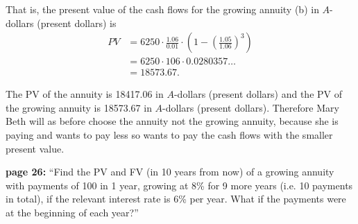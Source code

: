 \documentclass{amsart}
\begin{document}
That is, the present value of the cash flows for the growing annuity (b)
in $A$-dollars (present dollars) is
\begin{align*}
PV&=6250 \cdot \frac{1.06}{0.01} \cdot \left(1- \left( \frac{1.05}{1.06} \right)^3\right)\\
&=6250 \cdot 106 \cdot 0.0280357\ldots\\
&=18573.67.
\end{align*}

The PV of the annuity is 18417.06 in $A$-dollars (present dollars) and the PV of the growing
annuity is 18573.67 in $A$-dollars (present dollars). Therefore
Mary Beth will as before choose the annuity not the growing annuity, because she is paying and wants to pay
less so wants to pay the cash flows with the smaller present value.

\newpage

\textbf{page 26:} ``Find the PV and FV (in 10 years from now) of a growing annuity with payments of 100 in 1 year, growing at 8\% for 9 more years (i.e. 10 payments in total), if the relevant interest rate is 6\% per year. 
What if the payments were at the beginning of each year?''
\end{document}
